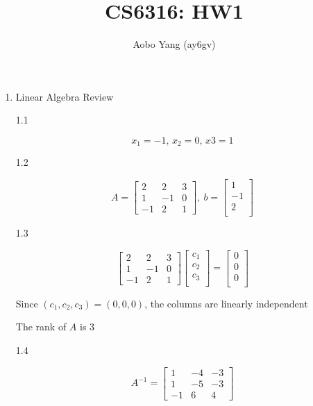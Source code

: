 \documentclass[11pt]{article}
\begin{document}
\author{Aobo Yang (ay6gv)}
\title{CS6316: HW1}
\maketitle

\medskip

\begin{enumerate}

\item
Linear Algebra Review

1.1

$$ x_1=-1,\, x_2=0,\, x3=1 $$

1.2

$$
A = \begin{bmatrix}
    2 & 2 & 3 \\
    1 & -1 & 0 \\
    -1 & 2 & 1
\end{bmatrix},
\:
b = \begin{bmatrix}
    1 \\
    -1 \\
    2 \\
\end{bmatrix}
$$

1.3

$$
\begin{bmatrix}
    2 & 2 & 3 \\
    1 & -1 & 0 \\
    -1 & 2 & 1
\end{bmatrix}\begin{bmatrix}
    c_1 \\
    c_2 \\
    c_3 \\
\end{bmatrix} = \begin{bmatrix}
    0 \\
    0 \\
    0 \\
\end{bmatrix}
$$

Since $(c_1, c_2, c_3) = (0, 0, 0)$, the columns are linearly independent

The rank of $A$ is $3$
\medskip

1.4

$$
A^{-1} = \begin{bmatrix}
    1 & -4 & -3 \\
    1 & -5 & -3 \\
    -1 & 6 & 4
\end{bmatrix}
$$


\end{enumerate}
\end{document}
